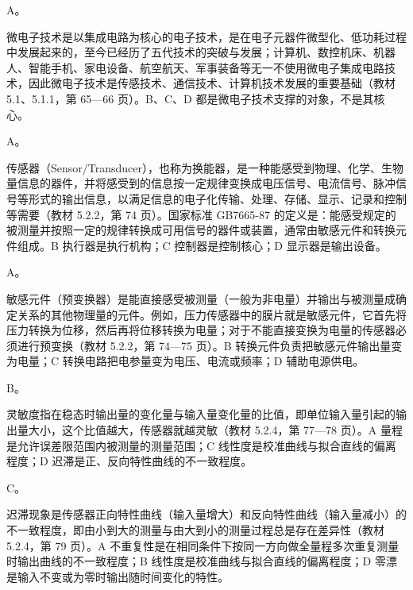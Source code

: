 \documentclass[a4paper,11pt]{article}
\begin{document}


\q A。\begin{analysis}微电子技术是以集成电路为核心的电子技术，是在电子元器件微型化、低功耗过程中发展起来的，至今已经历了五代技术的突破与发展；计算机、数控机床、机器人、智能手机、家电设备、航空航天、军事装备等无一不使用微电子集成电路技术，因此微电子技术是传感技术、通信技术、计算机技术发展的重要基础（教材 5.1、5.1.1，第 65—66 页）。B、C、D 都是微电子技术支撑的对象，不是其核心。\end{analysis}

\q A。\begin{analysis}传感器（Sensor/Transducer），也称为换能器，是一种能感受到物理、化学、生物量信息的器件，并将感受到的信息按一定规律变换成电压信号、电流信号、脉冲信号等形式的输出信息，以满足信息的电子化传输、处理、存储、显示、记录和控制等需要（教材 5.2.2，第 74 页）。国家标准 GB7665-87 的定义是：能感受规定的被测量并按照一定的规律转换成可用信号的器件或装置，通常由敏感元件和转换元件组成。B 执行器是执行机构；C 控制器是控制核心；D 显示器是输出设备。\end{analysis}

\q A。\begin{analysis}敏感元件（预变换器）是能直接感受被测量（一般为非电量）并输出与被测量成确定关系的其他物理量的元件。例如，压力传感器中的膜片就是敏感元件，它首先将压力转换为位移，然后再将位移转换为电量；对于不能直接变换为电量的传感器必须进行预变换（教材 5.2.2，第 74—75 页）。B 转换元件负责把敏感元件输出量变为电量；C 转换电路把电参量变为电压、电流或频率；D 辅助电源供电。\end{analysis}

\q B。\begin{analysis}灵敏度指在稳态时输出量的变化量与输入量变化量的比值，即单位输入量引起的输出量大小，这个比值越大，传感器就越灵敏（教材 5.2.4，第 77—78 页）。A 量程是允许误差限范围内被测量的测量范围；C 线性度是校准曲线与拟合直线的偏离程度；D 迟滞是正、反向特性曲线的不一致程度。\end{analysis}

\q C。\begin{analysis}迟滞现象是传感器正向特性曲线（输入量增大）和反向特性曲线（输入量减小）的不一致程度，即由小到大的测量与由大到小的测量过程总是存在差异性（教材 5.2.4，第 79 页）。A 不重复性是在相同条件下按同一方向做全量程多次重复测量时输出曲线的不一致程度；B 线性度是校准曲线与拟合直线的偏离程度；D 零漂是输入不变或为零时输出随时间变化的特性。\end{analysis}
\end{document}

